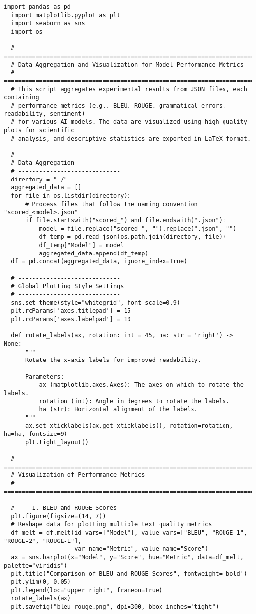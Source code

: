 \begin{lstlisting}[style=Python, caption={Python-qualitative-data-analysis}, captionpos=b]
  import pandas as pd
  import matplotlib.pyplot as plt
  import seaborn as sns
  import os
  
  # =============================================================================
  # Data Aggregation and Visualization for Model Performance Metrics
  # =============================================================================
  # This script aggregates experimental results from JSON files, each containing 
  # performance metrics (e.g., BLEU, ROUGE, grammatical errors, readability, sentiment)
  # for various AI models. The data are visualized using high-quality plots for scientific 
  # analysis, and descriptive statistics are exported in LaTeX format.
  
  # -----------------------------
  # Data Aggregation
  # -----------------------------
  directory = "./"
  aggregated_data = []
  for file in os.listdir(directory):
      # Process files that follow the naming convention "scored_<model>.json"
      if file.startswith("scored_") and file.endswith(".json"):
          model = file.replace("scored_", "").replace(".json", "")
          df_temp = pd.read_json(os.path.join(directory, file))
          df_temp["Model"] = model
          aggregated_data.append(df_temp)
  df = pd.concat(aggregated_data, ignore_index=True)
  
  # -----------------------------
  # Global Plotting Style Settings
  # -----------------------------
  sns.set_theme(style="whitegrid", font_scale=0.9)
  plt.rcParams['axes.titlepad'] = 15
  plt.rcParams['axes.labelpad'] = 10
  
  def rotate_labels(ax, rotation: int = 45, ha: str = 'right') -> None:
      """
      Rotate the x-axis labels for improved readability.
  
      Parameters:
          ax (matplotlib.axes.Axes): The axes on which to rotate the labels.
          rotation (int): Angle in degrees to rotate the labels.
          ha (str): Horizontal alignment of the labels.
      """
      ax.set_xticklabels(ax.get_xticklabels(), rotation=rotation, ha=ha, fontsize=9)
      plt.tight_layout()
  
  # =============================================================================
  # Visualization of Performance Metrics
  # =============================================================================
  
  # --- 1. BLEU and ROUGE Scores ---
  plt.figure(figsize=(14, 7))
  # Reshape data for plotting multiple text quality metrics
  df_melt = df.melt(id_vars=["Model"], value_vars=["BLEU", "ROUGE-1", "ROUGE-2", "ROUGE-L"], 
                    var_name="Metric", value_name="Score")
  ax = sns.barplot(x="Model", y="Score", hue="Metric", data=df_melt, palette="viridis")
  plt.title("Comparison of BLEU and ROUGE Scores", fontweight='bold')
  plt.ylim(0, 0.05)
  plt.legend(loc="upper right", frameon=True)
  rotate_labels(ax)
  plt.savefig("bleu_rouge.png", dpi=300, bbox_inches="tight")
  

\end{lstlisting}
